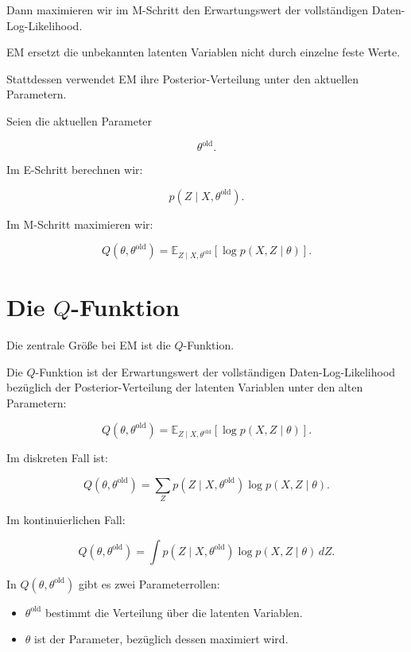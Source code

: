 Dann maximieren wir im M-Schritt den Erwartungswert der vollständigen Daten-Log-Likelihood.

\begin{conceptbox}
EM ersetzt die unbekannten latenten Variablen nicht durch einzelne feste Werte.

Stattdessen verwendet EM ihre Posterior-Verteilung unter den aktuellen Parametern.
\end{conceptbox}

Seien die aktuellen Parameter

\[
    \theta^{\mathrm{old}}.
\]

Im E-Schritt berechnen wir:

\[
    p(Z\mid X,\theta^{\mathrm{old}}).
\]

Im M-Schritt maximieren wir:

\[
    Q(\theta,\theta^{\mathrm{old}})
    =
    \mathbb{E}_{Z\mid X,\theta^{\mathrm{old}}}
    [
        \log p(X,Z\mid\theta)
    ].
\]

\section{Die \(Q\)-Funktion}

Die zentrale Größe bei EM ist die \(Q\)-Funktion.

\begin{definitionbox}
Die \(Q\)-Funktion ist der Erwartungswert der vollständigen Daten-Log-Likelihood bezüglich der Posterior-Verteilung der latenten Variablen unter den alten Parametern:

\[
    Q(\theta,\theta^{\mathrm{old}})
    =
    \mathbb{E}_{Z\mid X,\theta^{\mathrm{old}}}
    [
        \log p(X,Z\mid\theta)
    ].
\]
\end{definitionbox}

Im diskreten Fall ist:

\[
    Q(\theta,\theta^{\mathrm{old}})
    =
    \sum_Z
    p(Z\mid X,\theta^{\mathrm{old}})
    \log p(X,Z\mid\theta).
\]

Im kontinuierlichen Fall:

\[
    Q(\theta,\theta^{\mathrm{old}})
    =
    \int
    p(Z\mid X,\theta^{\mathrm{old}})
    \log p(X,Z\mid\theta)
    \,dZ.
\]

\begin{notebox}
In \(Q(\theta,\theta^{\mathrm{old}})\) gibt es zwei Parameterrollen:

\begin{itemize}
    \item \(\theta^{\mathrm{old}}\) bestimmt die Verteilung über die latenten Variablen.
    \item \(\theta\) ist der Parameter, bezüglich dessen maximiert wird.
\end{itemize}
\end{notebox}

